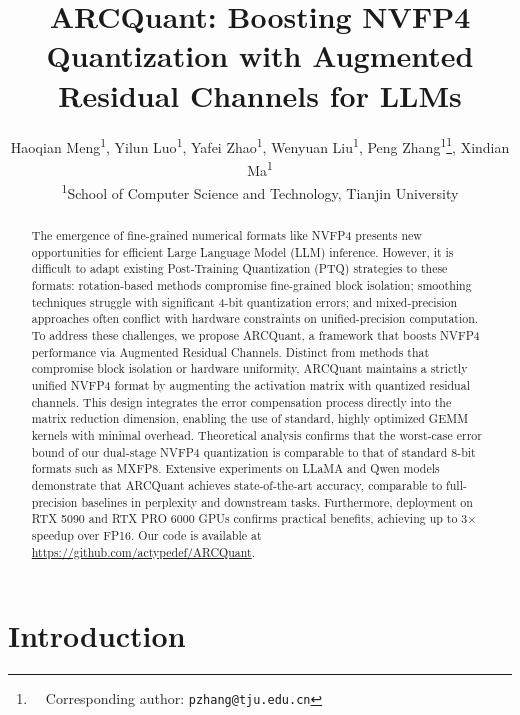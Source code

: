 \documentclass[11pt]{article}
\title{ARCQuant: Boosting NVFP4 Quantization with Augmented Residual Channels for LLMs}
\author{
  Haoqian Meng\textsuperscript{1}, Yilun Luo\textsuperscript{1}, Yafei Zhao\textsuperscript{1}, Wenyuan Liu\textsuperscript{1}, Peng Zhang\textsuperscript{1}\thanks{\ \ Corresponding author: \texttt{pzhang@tju.edu.cn}}, Xindian Ma\textsuperscript{1} \\
  \textsuperscript{1}School of Computer Science and Technology, Tianjin University
}
\begin{document}
\maketitle
\begin{abstract}
The emergence of fine-grained numerical formats like NVFP4 presents new opportunities for efficient Large Language Model (LLM) inference. However, it is difficult to adapt existing Post-Training Quantization (PTQ) strategies to these formats: rotation-based methods compromise fine-grained block isolation; smoothing techniques struggle with significant 4-bit quantization errors; and mixed-precision approaches often conflict with hardware constraints on unified-precision computation. To address these challenges, we propose ARCQuant, a framework that boosts NVFP4 performance via Augmented Residual Channels. Distinct from methods that compromise block isolation or hardware uniformity, ARCQuant maintains a strictly unified NVFP4 format by augmenting the activation matrix with quantized residual channels. This design integrates the error compensation process directly into the matrix reduction dimension, enabling the use of standard, highly optimized GEMM kernels with minimal overhead. Theoretical analysis confirms that the worst-case error bound of our dual-stage NVFP4 quantization is comparable to that of standard 8-bit formats such as MXFP8. Extensive experiments on LLaMA and Qwen models demonstrate that ARCQuant achieves state-of-the-art accuracy, comparable to full-precision baselines in perplexity and downstream tasks. Furthermore, deployment on RTX 5090 and RTX PRO 6000 GPUs confirms practical benefits, achieving up to 3× speedup over FP16. Our code is available at \url{https://github.com/actypedef/ARCQuant}.  
\end{abstract}

\section{Introduction}

\label{sec:introduction}

\end{document}
